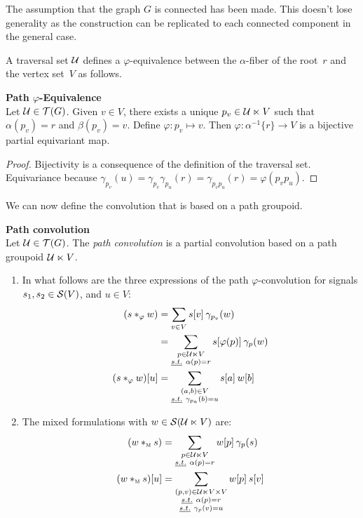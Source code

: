 \begin{remark}The assumption that the graph $G$ is connected has been made. This doesn't lose generality as the construction can be replicated to each connected component in the general case.
\end{remark}

A traversal set $\cu$ defines a $\varphi$-equivalence between the $\alpha$-fiber of the root~$r$ and the vertex set~$V$ as follows.

\begin{lemma}\textbf{Path $\varphi$-Equivalence}\\
Let $\cu \in \tree(G)$. Given $v \in V$, there exists a unique $p_v \in \cu \ltimes V$ such that $\alpha(p_v) = r$ and $\beta(p_v) = v$. Define $\varphi: p_v \mapsto v$. Then $\varphi: \alpha^{-1}\{r\} \rightarrow V$ is a bijective partial equivariant map.
\end{lemma}
\begin{proof}
Bijectivity is a consequence of the definition of the traversal set.
Equivariance because $\gamma_{p_v}(u) = \gamma_{p_v}\gamma_{p_u}(r) = \gamma_{p_vp_u}(r) = \varphi(p_vp_u)$.
\end{proof}

We can now define the convolution that is based on a path groupoid.

\begin{definition}\textbf{Path convolution}\\
Let $\cu \in \tree(G)$. The \emph{path convolution} is a partial convolution based on a path groupoid $\cu \ltimes V$.
\begin{enumerate}[label=(\roman*)]
  \item In what follows are the three expressions of the path $\varphi$-convolution for signals $s_1, s_2 \in \cs(V)$, and $u \in V$:
\begin{align*}
(s \ast_\varphi w) & = \displaystyle\sum_{v \in V} s[v] \h{2} \gamma_{p_v}(w)\\
                   & = \displaystyle\sum_{\substack{p \in \cu \ltimes V\\ \st \alpha(p) = r}} s[\varphi(p)] \h{2} \gamma_{p}(w)\\
(s \ast_\varphi w)[u] & = \displaystyle\sum_{\substack{(a,b) \in V\\ \st \gamma_{p_a}(b)=u}} s[a] \h{2} w[b]
\end{align*}
  \item The mixed formulations with $w \in \cs(\cu \ltimes V)$ are:
\begin{align*}
(w \ast_{\M} s) & = \displaystyle\sum_{\substack{p \in \cu \ltimes V\\ \st \alpha(p) = r}} w[p] \h{2} \gamma_{p}(s)\\
(w \ast_{\M} s)[u] & = \displaystyle\sum_{\substack{(p,v) \in \cu \ltimes V \times V\\ \st \alpha(p) = r\\ \st \gamma_{p}(v)=u}} w[p] \h{2} s[v]
\end{align*}
\end{enumerate}
\end{definition}

